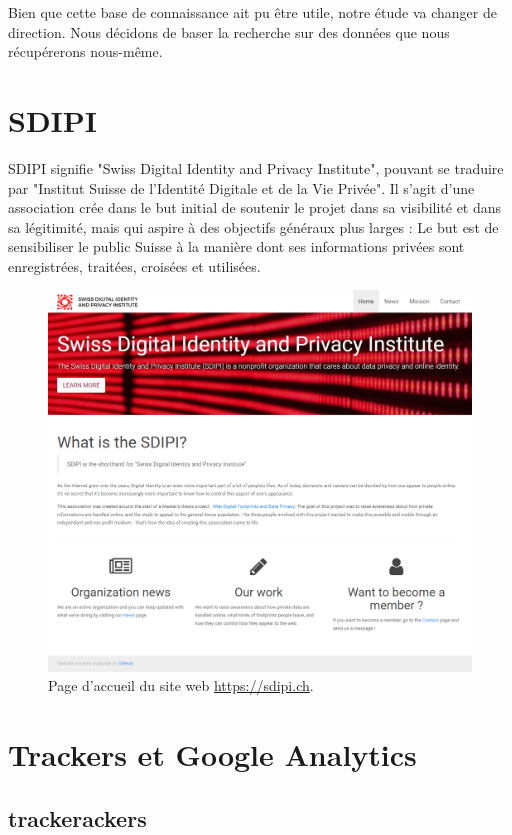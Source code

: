 		Bien que cette base de connaissance ait pu être utile, notre étude va changer de direction. Nous décidons de baser la recherche sur des données que nous récupérerons nous-même.

\section{SDIPI}

	SDIPI signifie "Swiss Digital Identity and Privacy Institute", pouvant se traduire par "Institut Suisse de l'Identité Digitale et de la Vie Privée". Il s'agit d'une association crée dans le but initial de soutenir le projet dans sa visibilité et dans sa légitimité, mais qui aspire à des objectifs généraux plus larges : Le but est de sensibiliser le public Suisse à la manière dont ses informations privées sont  enregistrées, traitées, croisées et utilisées.

	\begin{figure}[h]
		\centering
		\includegraphics[width=1\textwidth]{images/design/sdipi_home}
		\caption{Page d'accueil du site web \url{https://sdipi.ch}.}
		\label{a-sdipi}
	\end{figure}


\section{Trackers et Google Analytics}

	\subsection{trackerackers}

